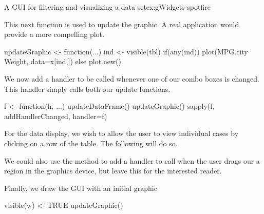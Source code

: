 \begin{example}{A GUI for filtering and visualizing a data set}{ex:gWidgets-spotfire}

This next function is used to update the graphic. A real application
would provide a more compelling plot.
\begin{Schunk}
\begin{Sinput}
 updateGraphic <- function(...) {
   ind <- visible(tbl)
   if(any(ind))
     plot(MPG.city ~ Weight, data=x[ind,])
   else
     plot.new()
 }
\end{Sinput}
\end{Schunk}

We now add a handler to be called whenever one of our combo boxes is
changed. This handler simply calls both our update functions.
\begin{Schunk}
\begin{Sinput}
 f <- function(h, ...) {
   updateDataFrame()
   updateGraphic()
 }
 sapply(l, addHandlerChanged, handler=f)
\end{Sinput}
\end{Schunk}
%
For the data display, we wish to allow the user to view individual cases
by clicking on a row of the table. The following will do so.

\begin{Schunk}
\end{Schunk}
%
We could also use the  method to
add a handler to call when the user drags our a region in the graphics
device, but leave this for the interested reader.


Finally, we draw the GUI with an initial graphic
\begin{Schunk}
\begin{Sinput}
 visible(w) <- TRUE
 updateGraphic()
\end{Sinput}
\end{Schunk}
\end{example}

